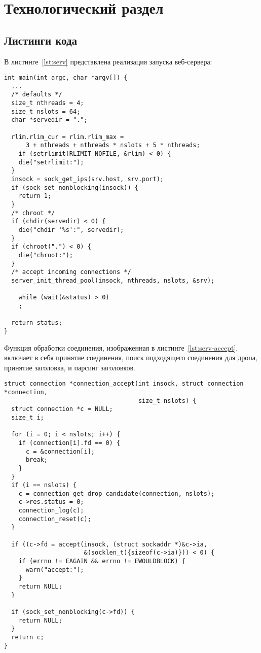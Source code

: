\section{Технологический раздел}

\subsection{Листинги кода}

В листинге~\ref{lst:serv} представлена реализация запуска веб-сервера:

\begin{center}
\captionsetup{justification=raggedright,singlelinecheck=off}
\begin{lstlisting}[label=lst:serv,caption=Запуск WEB-сервера]
int main(int argc, char *argv[]) {
  ...
  /* defaults */
  size_t nthreads = 4;
  size_t nslots = 64;
  char *servedir = ".";

  rlim.rlim_cur = rlim.rlim_max =
      3 + nthreads + nthreads * nslots + 5 * nthreads;
	if (setrlimit(RLIMIT_NOFILE, &rlim) < 0) {
    die("setrlimit:");
  }
  insock = sock_get_ips(srv.host, srv.port);
  if (sock_set_nonblocking(insock)) {
    return 1;
  }
  /* chroot */
  if (chdir(servedir) < 0) {
    die("chdir '%s':", servedir);
  }
  if (chroot(".") < 0) {
    die("chroot:");
  }
  /* accept incoming connections */
  server_init_thread_pool(insock, nthreads, nslots, &srv);

	while (wait(&status) > 0)
    ;

  return status;
}
\end{lstlisting}
\end{center}

Функция обработки соединения, изображенная в листинге~\ref{lst:serv-accept}, включает в себя принятие соединения, поиск подходящего соединения для дропа, принятие заголовка, и парсинг заголовков.

\begin{center}
\captionsetup{justification=raggedright,singlelinecheck=off}
\begin{lstlisting}[label=lst:serv-accept,caption=Функция обработки соединения]
struct connection *connection_accept(int insock, struct connection *connection,
                                     size_t nslots) {
  struct connection *c = NULL;
  size_t i;

  for (i = 0; i < nslots; i++) {
    if (connection[i].fd == 0) {
      c = &connection[i];
      break;
    }
  }
  if (i == nslots) {
    c = connection_get_drop_candidate(connection, nslots);
    c->res.status = 0;
    connection_log(c);
    connection_reset(c);
  }

  if ((c->fd = accept(insock, (struct sockaddr *)&c->ia,
                      &(socklen_t){sizeof(c->ia)})) < 0) {
    if (errno != EAGAIN && errno != EWOULDBLOCK) {
      warn("accept:");
    }
    return NULL;
  }

  if (sock_set_nonblocking(c->fd)) {
    return NULL;
  }
  return c;
}
\end{lstlisting}
\end{center}

